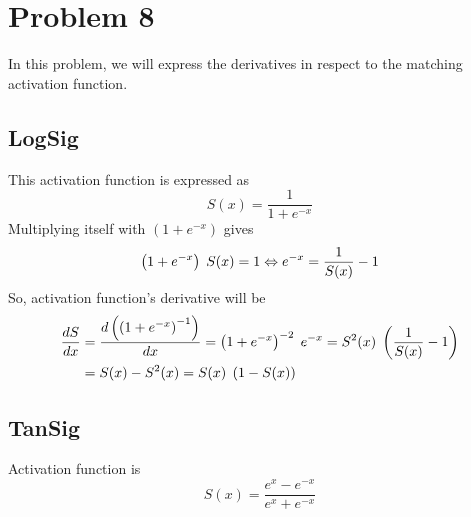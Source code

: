 \section{Problem 8}

In this problem, we will express the derivatives in respect to the matching activation function.

\subsection{LogSig}

This activation function is expressed as
\[
S(x) = \dfrac{1}{1 + e^{-x}}
\]
Multiplying itself with $\left(1 + e^{-x}\right)$ gives
\[
\left(1 + e^{-x}\right) \hspace{1mm} S(x) = 1 \Leftrightarrow e^{-x} = \frac{1}{S(x)} - 1
\]
So, activation function's derivative will be
\[
\begin{aligned}[c]
\dfrac{dS}{dx} &= \dfrac{d\left(\left(1+e^{-x}\right)^{-1}\right)}{dx} = \left(1+e^{-x}\right)^{-2} \hspace{1mm} e^{-x} = S^2(x) \hspace{1mm} \left(\dfrac{1}{S(x)} -1 \right) \\
&= S(x) - S^2(x) = S(x) \hspace{1mm} \left( 1 - S(x) \right)
\end{aligned}
\]

\subsection{TanSig}

Activation function is 
\[
S(x) = \dfrac{e^x - e^{-x}}{e^x + e^{-x}}
\]